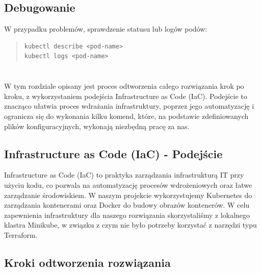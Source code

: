 \documentclass[polish]{aghengthesis}
\begin{document}
\section{Debugowanie}

W przypadku problemów, sprawdzenie statusu lub logów podów:
\begin{quote}
\begin{lstlisting}[basicstyle=\ttfamily, numbers=none]
kubectl describe <pod-name>
kubectl logs <pod-name>
\end{lstlisting}
\end{quote}

\chapter{\ChapterTitleSolutionSteps}
\label{sec:odtworzenie}

W tym rozdziale opisany jest proces odtworzenia całego rozwiązania krok po kroku, z wykorzystaniem podejścia Infrastructure as Code (IaC). Podejście to znacząco ułatwia proces wdrażania infrastruktury, poprzez jego automatyzację i ogranicza się do wykonania kilku komend, które, na podstawie zdefiniowanych plików konfiguracyjnych, wykonają niezbędną pracę za nas.

\section{Infrastructure as Code (IaC) - Podejście}

Infrastructure as Code (IaC) to praktyka zarządzania infrastrukturą IT przy użyciu kodu, co pozwala na automatyzację procesów wdrożeniowych oraz łatwe zarządzanie środowiskiem. W naszym projekcie wykorzystujemy Kubernetes do zarządzania kontenerami oraz Docker do budowy obrazów kontenerów. W celu zapewnienia infrastruktury dla naszego rozwiązania skorzystaliśmy z lokalnego klastra Minikube, w związku z czym nie było potrzeby korzystać z narzędzi typu Terraform.

\section{Kroki odtworzenia rozwiązania}
\end{document}
